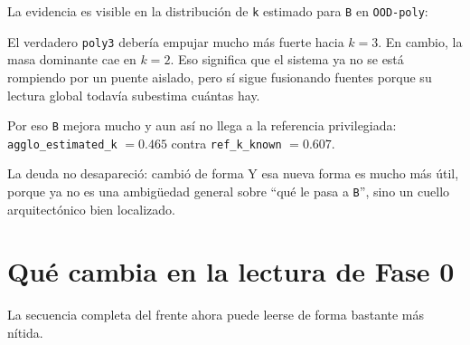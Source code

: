 \documentclass[11pt]{article}
\begin{document}
La evidencia es visible en la distribución de \texttt{k} estimado para \texttt{B} en \texttt{OOD-poly}:

\begin{figure}[H]
\centering
{}
\end{figure}

El verdadero \texttt{poly3} debería empujar mucho más fuerte hacia $k=3$. En cambio, la masa dominante cae en $k=2$. Eso significa que el sistema ya no se está rompiendo por un puente aislado, pero sí sigue fusionando fuentes porque su lectura global todavía subestima cuántas hay.

Por eso \texttt{B} mejora mucho y aun así no llega a la referencia privilegiada: \texttt{agglo\_estimated\_k} $=0.465$ contra \texttt{ref\_k\_known} $=0.607$.

\begin{keybox}{La deuda no desapareció: cambió de forma}
Y esa nueva forma es mucho más útil, porque ya no es una ambigüedad general sobre ``qué le pasa a \texttt{B}'', sino un cuello arquitectónico bien localizado.
\end{keybox}

\section{Qué cambia en la lectura de Fase 0}

La secuencia completa del frente ahora puede leerse de forma bastante más nítida.
\end{document}
